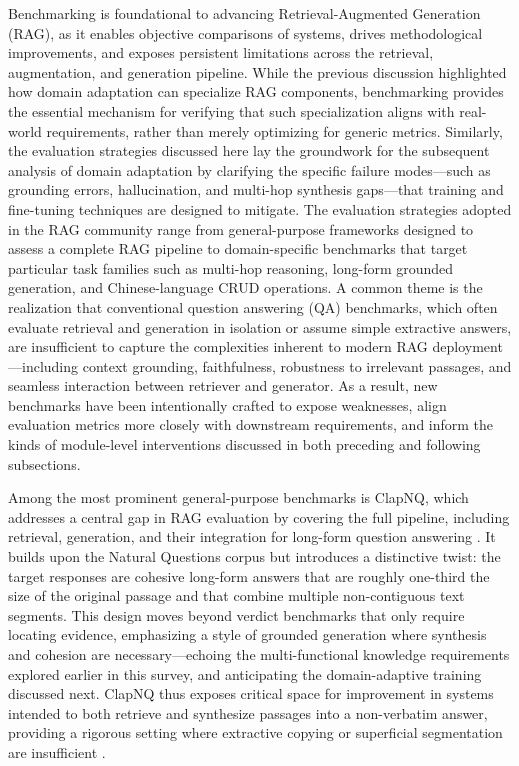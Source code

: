 \documentclass[11pt]{article}
\begin{document}
Benchmarking is foundational to advancing Retrieval-Augmented Generation (RAG), as it enables objective comparisons of systems, drives methodological improvements, and exposes persistent limitations across the retrieval, augmentation, and generation pipeline. While the previous discussion highlighted how domain adaptation can specialize RAG components, benchmarking provides the essential mechanism for verifying that such specialization aligns with real-world requirements, rather than merely optimizing for generic metrics. Similarly, the evaluation strategies discussed here lay the groundwork for the subsequent analysis of domain adaptation by clarifying the specific failure modes---such as grounding errors, hallucination, and multi-hop synthesis gaps---that training and fine-tuning techniques are designed to mitigate. The evaluation strategies adopted in the RAG community range from general-purpose frameworks designed to assess a complete RAG pipeline to domain-specific benchmarks that target particular task families such as multi-hop reasoning, long-form grounded generation, and Chinese-language CRUD operations. A common theme is the realization that conventional question answering (QA) benchmarks, which often evaluate retrieval and generation in isolation or assume simple extractive answers, are insufficient to capture the complexities inherent to modern RAG deployment---including context grounding, faithfulness, robustness to irrelevant passages, and seamless interaction between retriever and generator. As a result, new benchmarks have been intentionally crafted to expose weaknesses, align evaluation metrics more closely with downstream requirements, and inform the kinds of module-level interventions discussed in both preceding and following subsections.

Among the most prominent general-purpose benchmarks is ClapNQ, which addresses a central gap in RAG evaluation by covering the full pipeline, including retrieval, generation, and their integration for long-form question answering \cite{ref211}. It builds upon the Natural Questions corpus but introduces a distinctive twist: the target responses are cohesive long-form answers that are roughly one-third the size of the original passage and that combine multiple non-contiguous text segments. This design moves beyond verdict benchmarks that only require locating evidence, emphasizing a style of grounded generation where synthesis and cohesion are necessary---echoing the multi-functional knowledge requirements explored earlier in this survey, and anticipating the domain-adaptive training discussed next. ClapNQ thus exposes critical space for improvement in systems intended to both retrieve and synthesize passages into a non-verbatim answer, providing a rigorous setting where extractive copying or superficial segmentation are insufficient \cite{ref211}.
\end{document}
